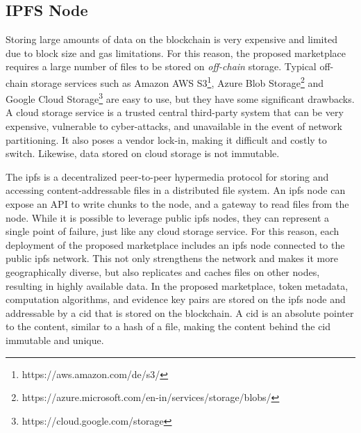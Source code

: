            
\subsection{IPFS Node}
\label{subsec:ipfs}

Storing large amounts of data on the blockchain is very expensive and limited due to block size and gas limitations. For this reason, the proposed marketplace requires a large number of files to be stored on \emph{off-chain} storage. Typical off-chain storage services such as Amazon AWS S3\footnote{https://aws.amazon.com/de/s3/}, Azure Blob Storage\footnote{https://azure.microsoft.com/en-in/services/storage/blobs/} and Google Cloud Storage\footnote{https://cloud.google.com/storage} are easy to use, but they have some significant drawbacks. A cloud storage service is a trusted central third-party system that can be very expensive, vulnerable to cyber-attacks, and unavailable in the event of network partitioning. It also poses a vendor lock-in, making it difficult and costly to switch. Likewise, data stored on cloud storage is not immutable.

The \acrfull{ipfs} is a decentralized peer-to-peer hypermedia protocol for storing and accessing content-addressable files in a distributed file system. An \acrshort{ipfs} node can expose an API to write chunks to the node, and a gateway to read files from the node. While it is possible to leverage public \acrshort{ipfs} nodes, they can represent a single point of failure, just like any cloud storage service. For this reason, each deployment of the proposed marketplace includes an \acrshort{ipfs} node connected to the public \acrshort{ipfs} network. This not only strengthens the network and makes it more geographically diverse, but also replicates and caches files on other nodes, resulting in highly available data. In the proposed marketplace, token metadata, computation algorithms, and evidence key pairs are stored on the \acrshort{ipfs} node and addressable by a \acrfull{cid} that is stored on the blockchain. A \acrshort{cid} is an absolute pointer to the content, similar to a hash of a file, making the content behind the \acrshort{cid} immutable and unique.

